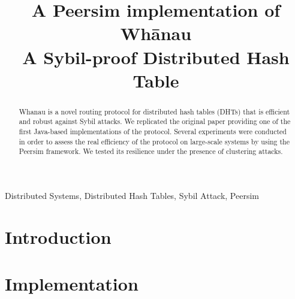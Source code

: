 \documentclass[conference, 10pt]{IEEEtran}
\begin{document}
%
\title{A Peersim implementation of Wh\={a}nau \\{\Large A Sybil-proof Distributed Hash Table}}
%

\author{
\and
{}
}
%
%
%
\maketitle              %
%
\begin{abstract}
Whanau is a novel routing protocol for distributed hash tables (DHTs) that is efficient and robust against Sybil attacks. We replicated the original paper providing one of the first Java-based implementations of the protocol. Several experiments were conducted in order to assess the real efficiency of the protocol on large-scale systems by using the Peersim framework.  We tested its resilience under the presence of clustering attacks.
\end{abstract}

\begin{IEEEkeywords} Distributed Systems, Distributed Hash Tables, Sybil Attack,  Peersim
\end{IEEEkeywords}
%
%
%
\section{Introduction}



\section{Implementation\label{impl}}
\end{document}
